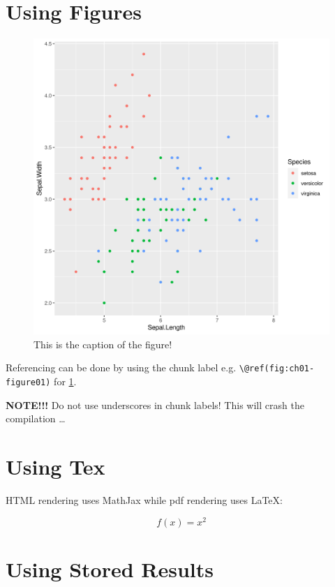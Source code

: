 \documentclass[]{krantz}
\begin{document}
\citet{rlang}

\hypertarget{using-figures}{%
\section{Using Figures}\label{using-figures}}

\begin{figure}

{\centering \includegraphics[width=0.8\linewidth]{figures/000-test/ch01-figure01} 

}

\caption{This is the caption of the figure!}\label{fig:ch01-figure01}
\end{figure}



Referencing can be done by using the chunk label e.g. \texttt{\textbackslash{}@ref(fig:ch01-figure01)} for \ref{fig:ch01-figure01}.

\textbf{NOTE!!!} Do not use underscores in chunk labels! This will crash the compilation \ldots{}

\hypertarget{using-tex}{%
\section{Using Tex}\label{using-tex}}

HTML rendering uses MathJax while pdf rendering uses LaTeX:

\[
f(x) = x^2
\]

\hypertarget{using-stored-results}{%
\section{Using Stored Results}\label{using-stored-results}}
\end{document}
